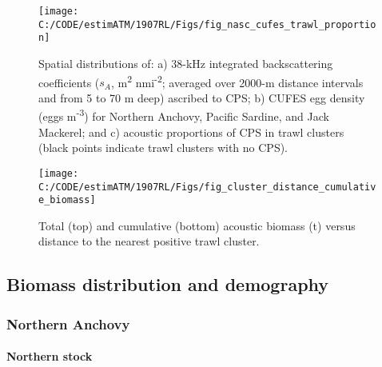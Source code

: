 \documentclass[]{article}
\let\oldparagraph\paragraph
\renewcommand{\paragraph}[1]{\oldparagraph{#1}\mbox{}}
\newcommand{\blandscape}{\begin{landscape}} \newcommand{\elandscape}{\end{landscape}}
\begin{document}
\newpage  
\blandscape



\begin{figure}[H]

{\centering \texttt{[image: C:/CODE/estimATM/1907RL/Figs/fig\_nasc\_cufes\_trawl\_proportion]} 

}

\caption{Spatial distributions of: a) 38-kHz integrated backscattering coefficients (\(s_A\), m\textsuperscript{2} nmi\textsuperscript{-2}; averaged over 2000-m distance intervals and from 5 to 70 m deep) ascribed to CPS; b) CUFES egg density (eggs m\textsuperscript{-3}) for Northern Anchovy, Pacific Sardine, and Jack Mackerel; and c) acoustic proportions of CPS in trawl clusters (black points indicate trawl clusters with no CPS).}\label{fig:nasc-cufes-trawl}
\end{figure}

\elandscape
\newpage



\newpage
\blandscape



\begin{figure}[H]

{\centering \texttt{[image: C:/CODE/estimATM/1907RL/Figs/fig\_cluster\_distance\_cumulative\_biomass]} 

}

\caption{Total (top) and cumulative (bottom) acoustic biomass (t) versus distance to the nearest positive trawl cluster.}\label{fig:biomass-cluster-distance}
\end{figure}

\elandscape  
\newpage

\hypertarget{results-biomass-distribution}{%
\subsection{Biomass distribution and demography}\label{results-biomass-distribution}}

\hypertarget{results-anchovy}{%
\subsubsection{Northern Anchovy}\label{results-anchovy}}

\hypertarget{results-anchovy-northern}{%
\paragraph{Northern stock}\label{results-anchovy-northern}}
\end{document}
